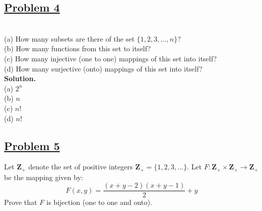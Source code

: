 \documentclass[10pt,letterpaper]{article}
\begin{document}
	\subsection*{{\color{purple}\underline{Problem 4}}}
	 \text{  } \\
	(a) How many subsets are there of the set $\{1, 2, 3, \ldots, n\}$? \\
	(b) How many functions from this set to itself? \\
	(c) How many injective (one to one) mappings of this set into itself? \\
	(d) How many surjective (onto) mappings of this set into itself? \\
	
	\textbf{Solution.} \\
	(a) $2^{n}$ \\
	(b) $n$  \\
	(c) $n!$ \\
	(d) $n!$ \\
	
	\subsection*{{\color{purple}\underline{Problem 5}}}
	 Let $\mathbf{Z_{+}}$ denote the set of positive
	integers $\mathbf{Z_{+}} = \{1, 2, 3, \ldots \}$. Let $F: \mathbf{Z_{+}} \times \mathbf{Z_{+}} \rightarrow \mathbf{Z_{+}}$
	be the mapping given by:
	$$F(x, y) = \dfrac{(x + y - 2)(x + y - 1)}{2} + y$$
	Prove that $F$ is bijection (one to one and onto).\\
	
\end{document}

